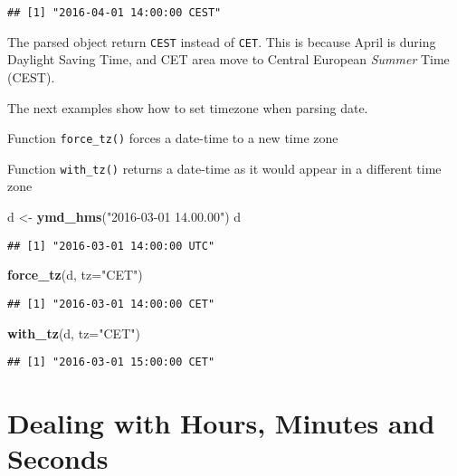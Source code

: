 \documentclass[]{book}
\newenvironment{Shaded}{\begin{snugshade}}{\end{snugshade}}
\newcommand{\KeywordTok}[1]{\textcolor[rgb]{0.13,0.29,0.53}{\textbf{{#1}}}}
\newcommand{\DataTypeTok}[1]{\textcolor[rgb]{0.13,0.29,0.53}{{#1}}}
\newcommand{\StringTok}[1]{\textcolor[rgb]{0.31,0.60,0.02}{{#1}}}
\newcommand{\NormalTok}[1]{{#1}}
\begin{document}
\begin{verbatim}
## [1] "2016-04-01 14:00:00 CEST"
\end{verbatim}

The parsed object return \texttt{CEST} instead of \texttt{CET}. This is
because April is during Daylight Saving Time, and CET area move to
Central European \emph{Summer} Time (CEST).

The next examples show how to set timezone when parsing date.

Function \texttt{force\_tz()} forces a date-time to a new time zone

Function \texttt{with\_tz()} returns a date-time as it would appear in a
different time zone

\begin{Shaded}
\begin{Highlighting}[]
\NormalTok{d <-}\StringTok{ }\KeywordTok{ymd_hms}\NormalTok{(}\StringTok{"2016-03-01 14.00.00"}\NormalTok{)}
\NormalTok{d}
\end{Highlighting}
\end{Shaded}

\begin{verbatim}
## [1] "2016-03-01 14:00:00 UTC"
\end{verbatim}

\begin{Shaded}
\begin{Highlighting}[]
\KeywordTok{force_tz}\NormalTok{(d, }\DataTypeTok{tz=}\StringTok{"CET"}\NormalTok{)}
\end{Highlighting}
\end{Shaded}

\begin{verbatim}
## [1] "2016-03-01 14:00:00 CET"
\end{verbatim}

\begin{Shaded}
\begin{Highlighting}[]
\KeywordTok{with_tz}\NormalTok{(d, }\DataTypeTok{tz=}\StringTok{"CET"}\NormalTok{)}
\end{Highlighting}
\end{Shaded}

\begin{verbatim}
## [1] "2016-03-01 15:00:00 CET"
\end{verbatim}

\section{Dealing with Hours, Minutes and
Seconds}\label{dealing-with-hours-minutes-and-seconds}
\end{document}
